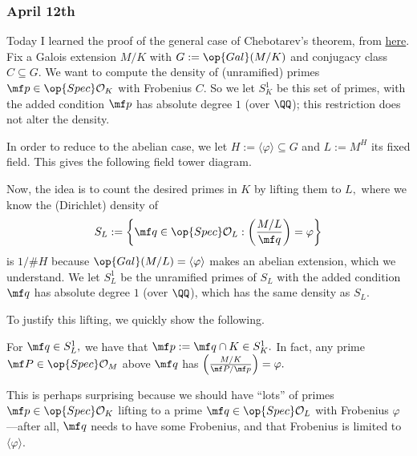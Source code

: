 \subsubsection{April 12th}
Today I learned the proof of the general case of Chebotarev's theorem, from \href{https://web.archive.org/web/20191104204155/https://math.mit.edu/classes/18.785/2016fa/LectureNotes26.pdf}{here}. Fix a Galois extension $M/K$ with $G:=\op{Gal}(M/K)$ and conjugacy class $C\subseteq G.$ We want to compute the density of (unramified) primes $\mf p\in\op{Spec}\mathcal O_K$ with Frobenius $C.$ So we let $S^1_K$ be this set of primes, with the added condition $\mf p$ has absolute degree $1$ (over $\QQ$); this restriction does not alter the density.

In order to reduce to the abelian case, we let $H:=\langle\varphi\rangle\subseteq G$ and $L:=M^H$ its fixed field. This gives the following field tower diagram.
\begin{center}
\end{center}
Now, the idea is to count the desired primes in $K$ by lifting them to $L,$ where we know the (Dirichlet) density of
\[S_L:=\left\{\mf q\in\op{Spec}\mathcal O_L:\left(\frac{M/L}{\mf q}\right)=\varphi\right\}\]
is $1/\#H$ because $\op{Gal}(M/L)=\langle\varphi\rangle$ makes an abelian extension, which we understand. We let $S^1_L$ be the unramified primes of $S_L$ with the added condition $\mf q$ has absolute degree $1$ (over $\QQ$), which has the same density as $S_L.$

To justify this lifting, we quickly show the following.
\begin{lemma}
    For $\mf q\in S^1_L,$ we have that $\mf p:=\mf q\cap K\in S^1_K.$ In fact, any prime $\mf P\in\op{Spec}\mathcal O_M$ above $\mf q$ has $\left(\frac{M/K}{\mf P/\mf p}\right)=\varphi.$ 
\end{lemma}
This is perhaps surprising because we should have ``lots'' of primes $\mf p\in\op{Spec}\mathcal O_K$ lifting to a prime $\mf q\in\op{Spec}\mathcal O_L$ with Frobenius $\varphi$---after all, $\mf q$ needs to have some Frobenius, and that Frobenius is limited to $\langle\varphi\rangle.$

